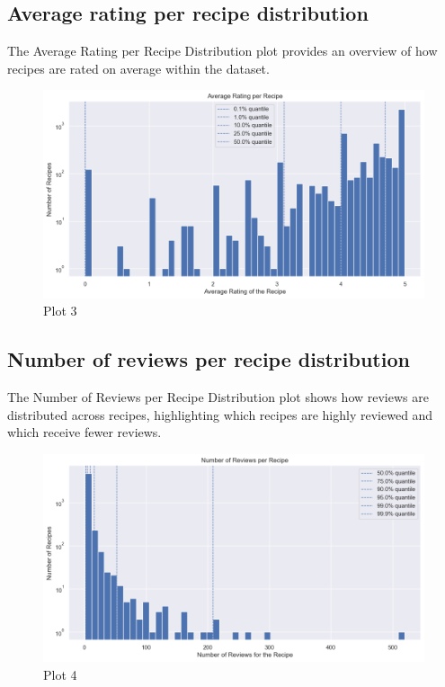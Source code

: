 \subsection{Average rating per recipe distribution}
The Average Rating per Recipe Distribution plot provides an overview of how recipes are rated on average within the dataset.
\begin{figure}[H]
    \centering
    \includegraphics[width=\linewidth]{Report/ReportLatex/Images/Analisysplots/plot3.png}
    \caption{Plot 3}
    \label{fig:enter-label}
    \end{figure}
\subsection{Number of reviews per recipe distribution}
The Number of Reviews per Recipe Distribution plot shows how reviews are distributed across recipes, highlighting which recipes are highly reviewed and which receive fewer reviews.
\begin{figure}[H]
    \centering
    \includegraphics[width=\linewidth]{Report/ReportLatex/Images/Analisysplots/plot4.png}
    \caption{Plot 4}
    \label{fig:enter-label}
    \end{figure}
